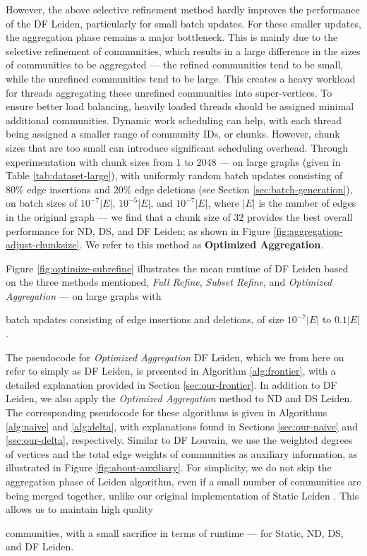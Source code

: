 However, the above selective refinement method hardly improves the performance of the DF Leiden, particularly for small batch updates. For these smaller updates, the aggregation phase remains a major bottleneck. This is mainly due to the selective refinement of communities, which results in a large difference in the sizes of communities to be aggregated --- the refined communities tend to be small, while the unrefined communities tend to be large. This creates a heavy workload for threads aggregating these unrefined communities into super-vertices. To ensure better load balancing, heavily loaded threads should be assigned minimal additional communities. Dynamic work scheduling can help, with each thread being assigned a smaller range of community IDs, or chunks. However, chunk sizes that are too small can introduce significant scheduling overhead. Through experimentation with chunk sizes from $1$ to $2048$ --- on large graphs (given in Table \ref{tab:dataset-large}), with uniformly random batch updates consisting of $80\%$ edge insertions and $20\%$ edge deletions (see Section \ref{sec:batch-generation}), on batch sizes of $10^{-7}|E|$, $10^{-5}|E|$, and $10^{-7}|E|$, where $|E|$ is the number of edges in the original graph --- we find that a chunk size of $32$ provides the best overall performance for ND, DS, and DF Leiden; as shown in Figure \ref{fig:aggregation-adjust-chunksize}. We refer to this method as \textbf{Optimized Aggregation}.

Figure \ref{fig:optimize-subrefine} illustrates the mean runtime of DF Leiden based on the three methods mentioned, \textit{Full Refine}, \textit{Subset Refine}, and \textit{Optimized Aggregation} --- on large graphs with batch updates consisting of edge insertions and deletions, of size $10^{-7}|E|$ to $0.1|E|$.

The pseudocode for \textit{Optimized Aggregation} DF Leiden, which we from here on refer to simply as DF Leiden, is presented in Algorithm \ref{alg:frontier}, with a detailed explanation provided in Section \ref{sec:our-frontier}. In addition to DF Leiden, we also apply the \textit{Optimized Aggregation} method to ND and DS Leiden. The corresponding pseudocode for these algorithms is given in Algorithms \ref{alg:naive} and \ref{alg:delta}, with explanations found in Sections \ref{sec:our-naive} and \ref{sec:our-delta}, respectively. Similar to DF Louvain, we use the weighted degrees of vertices and the total edge weights of communities as auxiliary information, as illustrated in Figure \ref{fig:about-auxiliary}. For simplicity, we do not skip the aggregation phase of Leiden algorithm, even if a small number of communities are being merged together, unlike our original implementation of Static Leiden \cite{sahu2023gveleiden}. This allows us to maintain high quality communities, with a small sacrifice in terms of runtime --- for Static, ND, DS, and DF Leiden.




